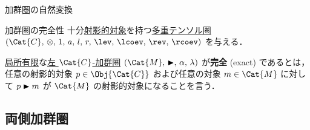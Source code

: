 \documentclass[TQFT_main]{subfiles}
\begin{document}
\begin{mydef}[label=def:module-nat,breakable]{加群圏の自然変換}
\begin{description}
        \begin{center}
        \end{center}
    \end{description}
\end{mydef}

\begin{mydef}[label=def:modulecat-exact]{加群圏の完全性}
    十分\hyperref[def:finite-abcat]{射影的対象}を持つ\hyperref[def:tensorfusion-cat]{多重テンソル圏} $(\Cat{C},\, \otimes,\, 1,\, a,\, l,\, r,\, \lev,\, \lcoev,\, \rev,\, \rcoev)$ を与える．

    \hyperref[def:finite-abcat]{局所有限}な\hyperref[def:modulecat]{左 $\Cat{C}$-加群圏} $(\Cat{M},\, \btr,\, \alpha,\, \lambda)$ が\textbf{完全} (exact) であるとは，任意の射影的対象 $p \in \Obj{\Cat{C}}$ および任意の対象 $m \in \Cat{M}$ に対して $p \blacktriangleright m$ が $\Cat{M}$ の射影的対象になることを言う．
\end{mydef}

\subsection{両側加群圏}
\end{document}

